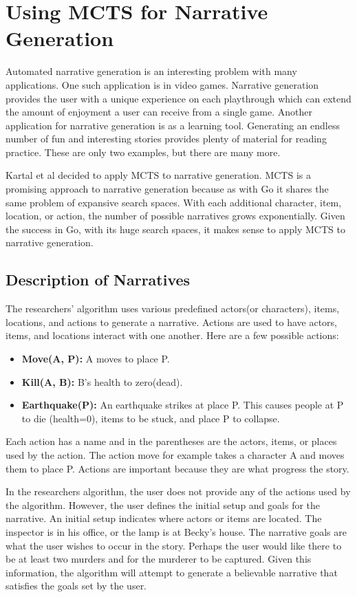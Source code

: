 \documentclass{sig-alternate}
\begin{document}
\section{Using MCTS for Narrative Generation}
Automated narrative generation is an interesting problem with many applications. One such application is in video games. Narrative generation provides the user with a unique experience on each playthrough which can extend the amount of enjoyment a user can receive from a single game. Another application for narrative generation is as a learning tool. Generating an endless number of fun and interesting stories provides plenty of material for reading practice. These are only two examples, but there are many more.

Kartal et al\cite{Narrative} decided to apply MCTS to narrative generation. MCTS is a promising approach to narrative generation because as with Go it shares the same problem of expansive search spaces. With each additional character, item, location, or action, the number of possible narratives grows exponentially. Given the success in Go, with its huge search spaces, it makes sense to apply MCTS to narrative generation.

\subsection{Description of Narratives}

The researchers' algorithm uses various predefined actors(or characters), items, locations, and actions to generate a narrative. Actions are used to have actors, items, and locations interact with one another. Here are a few possible actions:
\begin{itemize}
\item \textbf{Move(A, P):} A moves to place P.
\item \textbf{Kill(A, B):} B's health to zero(dead).
\item \textbf{Earthquake(P):} An earthquake strikes at place P. This causes people at P to die (health=0), items to be stuck, and place P to collapse.
\end{itemize}
Each action has a name and in the parentheses are the actors, items, or places used by the action. The action move for example takes a character A and moves them to place P. Actions are important because they are what progress the story. 

In the researchers algorithm, the user does not provide any of the actions used by the algorithm. However, the user defines the initial setup and goals for the narrative. An initial setup indicates where actors or items are located. The inspector is in his office, or the lamp is at Becky's house. The narrative goals are what the user wishes to occur in the story. Perhaps the user would like there to be at least two murders and for the murderer to be captured. Given this information, the algorithm will attempt to generate a believable narrative that satisfies the goals set by the user.
\end{document}
